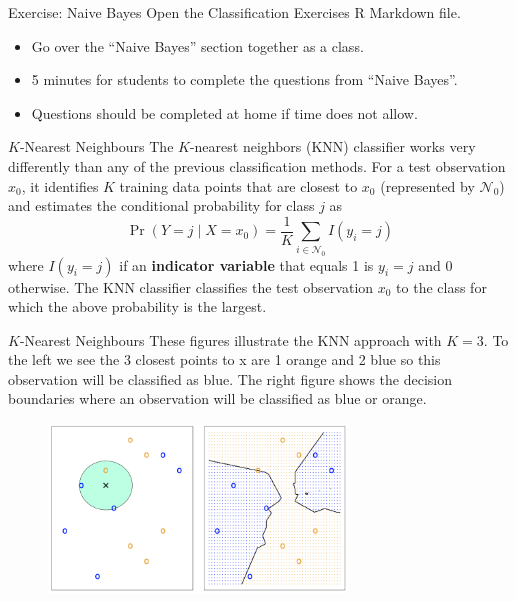 \documentclass[
  ignorenonframetext,
  aspectratio=169,
]{beamer}
\begin{document}
\begin{frame}{Exercise: Naive Bayes}
\protect\hypertarget{exercise-naive-bayes}{}
Open the Classification Exercises R Markdown file.

\begin{itemize}
\item
  Go over the ``Naive Bayes'' section together as a class.
\item
  5 minutes for students to complete the questions from ``Naive Bayes''.
\item
  Questions should be completed at home if time does not allow.
\end{itemize}
\end{frame}

\begin{frame}{\(K\)-Nearest Neighbours}
\protect\hypertarget{k-nearest-neighbours}{}
The \(K\)-nearest neighbors (KNN) classifier works very differently than
any of the previous classification methods. For a test observation
\(x_0\), it identifies \(K\) training data points that are closest to
\(x_0\) (represented by \(\mathcal{N}_0\)) and estimates the conditional
probability for class \(j\) as \[
\operatorname{Pr}\left(Y=j \mid X=x_{0}\right)=\frac{1}{K} \sum_{i \in \mathcal{N}_{0}} I\left(y_{i}=j\right)
\] where \(I(y_i = j)\) if an \textbf{indicator variable} that equals 1
is \(y_i = j\) and 0 otherwise. The KNN classifier classifies the test
observation \(x_0\) to the class for which the above probability is the
largest.
\end{frame}

\begin{frame}{\(K\)-Nearest Neighbours}
\protect\hypertarget{k-nearest-neighbours-1}{}
These figures illustrate the KNN approach with \(K=3\). To the left we
see the 3 closest points to x are 1 orange and 2 blue so this
observation will be classified as blue. The right figure shows the
decision boundaries where an observation will be classified as blue or
orange.

\begin{figure}

{\centering \includegraphics[width=3.125in,height=\textheight]{images/KNN1.png}

}

\end{figure}
\end{frame}
\end{document}
